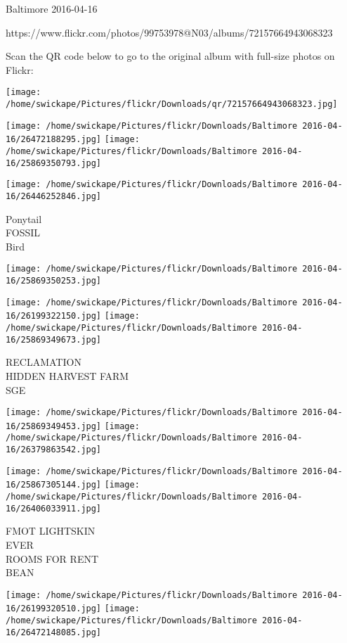 \documentclass[10pt,letterpaper]{article}
\begin{document}
Baltimore 2016-04-16

https://www.flickr.com/photos/99753978@N03/albums/72157664943068323

Scan the QR code below to go to the original album with full-size photos on Flickr:

\texttt{[image: /home/swickape/Pictures/flickr/Downloads/qr/72157664943068323.jpg]}
\pagebreak

\texttt{[image: /home/swickape/Pictures/flickr/Downloads/Baltimore 2016-04-16/26472188295.jpg]}
\texttt{[image: /home/swickape/Pictures/flickr/Downloads/Baltimore 2016-04-16/25869350793.jpg]}

\texttt{[image: /home/swickape/Pictures/flickr/Downloads/Baltimore 2016-04-16/26446252846.jpg]}

Ponytail\\
FOSSIL\\
Bird\\
\pagebreak

\texttt{[image: /home/swickape/Pictures/flickr/Downloads/Baltimore 2016-04-16/25869350253.jpg]}

\vspace{0.25in}
\texttt{[image: /home/swickape/Pictures/flickr/Downloads/Baltimore 2016-04-16/26199322150.jpg]}
\texttt{[image: /home/swickape/Pictures/flickr/Downloads/Baltimore 2016-04-16/25869349673.jpg]}

RECLAMATION\\
HIDDEN HARVEST FARM\\
SGE\\
\pagebreak

\texttt{[image: /home/swickape/Pictures/flickr/Downloads/Baltimore 2016-04-16/25869349453.jpg]}
\texttt{[image: /home/swickape/Pictures/flickr/Downloads/Baltimore 2016-04-16/26379863542.jpg]}

\texttt{[image: /home/swickape/Pictures/flickr/Downloads/Baltimore 2016-04-16/25867305144.jpg]}
\texttt{[image: /home/swickape/Pictures/flickr/Downloads/Baltimore 2016-04-16/26406033911.jpg]}

FMOT LIGHTSKIN\\
EVER\\
ROOMS FOR RENT\\
BEAN\\
\pagebreak

\texttt{[image: /home/swickape/Pictures/flickr/Downloads/Baltimore 2016-04-16/26199320510.jpg]}
\texttt{[image: /home/swickape/Pictures/flickr/Downloads/Baltimore 2016-04-16/26472148085.jpg]}
\end{document}
